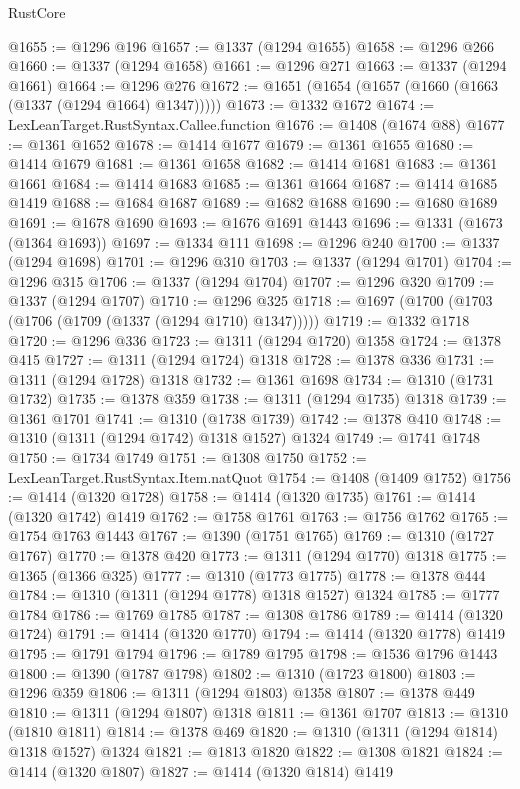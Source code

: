 \begin{lexlean}{RustCore}
\begin{coremodule}
@1655 := @1296 @196
@1657 := @1337 (@1294 @1655)
@1658 := @1296 @266
@1660 := @1337 (@1294 @1658)
@1661 := @1296 @271
@1663 := @1337 (@1294 @1661)
@1664 := @1296 @276
@1672 := @1651 (@1654 (@1657 (@1660 (@1663 (@1337 (@1294 @1664) @1347)))))
@1673 := @1332 @1672
@1674 := LexLeanTarget.RustSyntax.Callee.function
@1676 := @1408 (@1674 @88)
@1677 := @1361 @1652
@1678 := @1414 @1677
@1679 := @1361 @1655
@1680 := @1414 @1679
@1681 := @1361 @1658
@1682 := @1414 @1681
@1683 := @1361 @1661
@1684 := @1414 @1683
@1685 := @1361 @1664
@1687 := @1414 @1685 @1419
@1688 := @1684 @1687
@1689 := @1682 @1688
@1690 := @1680 @1689
@1691 := @1678 @1690
@1693 := @1676 @1691 @1443
@1696 := @1331 (@1673 (@1364 @1693))
@1697 := @1334 @111
@1698 := @1296 @240
@1700 := @1337 (@1294 @1698)
@1701 := @1296 @310
@1703 := @1337 (@1294 @1701)
@1704 := @1296 @315
@1706 := @1337 (@1294 @1704)
@1707 := @1296 @320
@1709 := @1337 (@1294 @1707)
@1710 := @1296 @325
@1718 := @1697 (@1700 (@1703 (@1706 (@1709 (@1337 (@1294 @1710) @1347)))))
@1719 := @1332 @1718
@1720 := @1296 @336
@1723 := @1311 (@1294 @1720) @1358
@1724 := @1378 @415
@1727 := @1311 (@1294 @1724) @1318
@1728 := @1378 @336
@1731 := @1311 (@1294 @1728) @1318
@1732 := @1361 @1698
@1734 := @1310 (@1731 @1732)
@1735 := @1378 @359
@1738 := @1311 (@1294 @1735) @1318
@1739 := @1361 @1701
@1741 := @1310 (@1738 @1739)
@1742 := @1378 @410
@1748 := @1310 (@1311 (@1294 @1742) @1318 @1527) @1324
@1749 := @1741 @1748
@1750 := @1734 @1749
@1751 := @1308 @1750
@1752 := LexLeanTarget.RustSyntax.Item.natQuot
@1754 := @1408 (@1409 @1752)
@1756 := @1414 (@1320 @1728)
@1758 := @1414 (@1320 @1735)
@1761 := @1414 (@1320 @1742) @1419
@1762 := @1758 @1761
@1763 := @1756 @1762
@1765 := @1754 @1763 @1443
@1767 := @1390 (@1751 @1765)
@1769 := @1310 (@1727 @1767)
@1770 := @1378 @420
@1773 := @1311 (@1294 @1770) @1318
@1775 := @1365 (@1366 @325)
@1777 := @1310 (@1773 @1775)
@1778 := @1378 @444
@1784 := @1310 (@1311 (@1294 @1778) @1318 @1527) @1324
@1785 := @1777 @1784
@1786 := @1769 @1785
@1787 := @1308 @1786
@1789 := @1414 (@1320 @1724)
@1791 := @1414 (@1320 @1770)
@1794 := @1414 (@1320 @1778) @1419
@1795 := @1791 @1794
@1796 := @1789 @1795
@1798 := @1536 @1796 @1443
@1800 := @1390 (@1787 @1798)
@1802 := @1310 (@1723 @1800)
@1803 := @1296 @359
@1806 := @1311 (@1294 @1803) @1358
@1807 := @1378 @449
@1810 := @1311 (@1294 @1807) @1318
@1811 := @1361 @1707
@1813 := @1310 (@1810 @1811)
@1814 := @1378 @469
@1820 := @1310 (@1311 (@1294 @1814) @1318 @1527) @1324
@1821 := @1813 @1820
@1822 := @1308 @1821
@1824 := @1414 (@1320 @1807)
@1827 := @1414 (@1320 @1814) @1419

\end{coremodule}
\end{lexlean}
